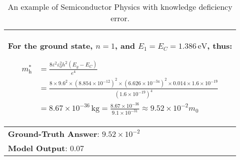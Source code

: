 \begin{table}[!t]
{\begin{tabular}{p{10cm}}
For the ground state, $ n=1 $, and $ E_{1} = E_{C} = 1.386 \, \mathrm{eV} $, thus:

$$
\begin{aligned}
m_{\mathrm{h}}^{*} &= \frac{8 \varepsilon^{2} \varepsilon_{0}^{2} h^{2} (E_{g} - E_{C})}{e^{4}} \\
&= \frac{8 \times 9.6^{2} \times (8.854 \times 10^{-12})^{2} \times (6.626 \times 10^{-34})^{2} \times 0.014 \times 1.6 \times 10^{-19}}{(1.6 \times 10^{-19})^{4}} \\
&= 8.67 \times 10^{-36}\, \mathrm{kg} = \frac{8.67 \times 10^{-36}}{9.1 \times 10^{-31}} \approx 9.52 \times 10^{-2} m_{0}
\end{aligned}
$$
\\
\midrule
\textbf{Ground-Truth Answer}: $ 9.52 \times 10^{-2} $ \\

\midrule
\textbf{Model Output}: $ 0.07 $\\
\bottomrule
\end{tabular}%
}
\caption{An example of Semiconductor Physics with knowledge deficiency error.}
\label{tabapp:error example 4}
\end{table}